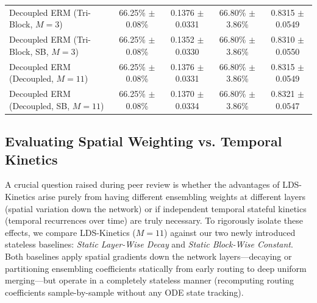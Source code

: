 \begin{table}[t]
\begin{center}
\begin{small}
\begin{sc}
\begin{tabular}{lcccc}
\midrule
Decoupled ERM (Tri-Block, $M=3$) & 66.25\% $\pm$ 0.08\% & 0.1376 $\pm$ 0.0331 & 66.80\% $\pm$ 3.86\% & 0.8315 $\pm$ 0.0549 \\
Decoupled ERM (Tri-Block, SB, $M=3$) & 66.25\% $\pm$ 0.08\% & 0.1352 $\pm$ 0.0330 & 66.80\% $\pm$ 3.86\% & 0.8310 $\pm$ 0.0550 \\
Decoupled ERM (Decoupled, $M=11$) & 66.25\% $\pm$ 0.08\% & 0.1376 $\pm$ 0.0331 & 66.80\% $\pm$ 3.86\% & 0.8315 $\pm$ 0.0549 \\
Decoupled ERM (Decoupled, SB, $M=11$) & 66.25\% $\pm$ 0.08\% & 0.1370 $\pm$ 0.0334 & 66.80\% $\pm$ 3.86\% & 0.8321 $\pm$ 0.0547 \\
\bottomrule
\end{tabular}
\end{sc}
\end{small}
\end{center}
\end{table}

\subsection{Evaluating Spatial Weighting vs. Temporal Kinetics}
A crucial question raised during peer review is whether the advantages of LDS-Kinetics arise purely from having different ensembling weights at different layers (spatial variation down the network) or if independent temporal stateful kinetics (temporal recurrences over time) are truly necessary. To rigorously isolate these effects, we compare LDS-Kinetics ($M=11$) against our two newly introduced stateless baselines: \emph{Static Layer-Wise Decay} and \emph{Static Block-Wise Constant}. Both baselines apply spatial gradients down the network layers—decaying or partitioning ensembling coefficients statically from early routing to deep uniform merging—but operate in a completely stateless manner (recomputing routing coefficients sample-by-sample without any ODE state tracking).

